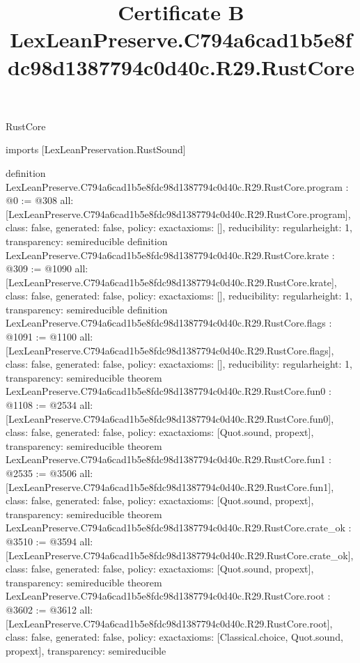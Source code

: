 \begin{lexlean}{RustCore}
\title{Certificate B LexLeanPreserve.C794a6cad1b5e8fdc98d1387794c0d40c.R29.RustCore}
\begin{coremodule}
imports [LexLeanPreservation.RustSound]

definition LexLeanPreserve.C794a6cad1b5e8fdc98d1387794c0d40c.R29.RustCore.program : @0 := @308 {
  all: [LexLeanPreserve.C794a6cad1b5e8fdc98d1387794c0d40c.R29.RustCore.program],
  class: false,
  generated: false,
  policy: exact{axioms: []},
  reducibility: regular{height: 1},
  transparency: semireducible
}
definition LexLeanPreserve.C794a6cad1b5e8fdc98d1387794c0d40c.R29.RustCore.krate : @309 := @1090 {
  all: [LexLeanPreserve.C794a6cad1b5e8fdc98d1387794c0d40c.R29.RustCore.krate],
  class: false,
  generated: false,
  policy: exact{axioms: []},
  reducibility: regular{height: 1},
  transparency: semireducible
}
definition LexLeanPreserve.C794a6cad1b5e8fdc98d1387794c0d40c.R29.RustCore.flags : @1091 := @1100 {
  all: [LexLeanPreserve.C794a6cad1b5e8fdc98d1387794c0d40c.R29.RustCore.flags],
  class: false,
  generated: false,
  policy: exact{axioms: []},
  reducibility: regular{height: 1},
  transparency: semireducible
}
theorem LexLeanPreserve.C794a6cad1b5e8fdc98d1387794c0d40c.R29.RustCore.fun0 : @1108 := @2534 {
  all: [LexLeanPreserve.C794a6cad1b5e8fdc98d1387794c0d40c.R29.RustCore.fun0],
  class: false,
  generated: false,
  policy: exact{axioms: [Quot.sound, propext]},
  transparency: semireducible
}
theorem LexLeanPreserve.C794a6cad1b5e8fdc98d1387794c0d40c.R29.RustCore.fun1 : @2535 := @3506 {
  all: [LexLeanPreserve.C794a6cad1b5e8fdc98d1387794c0d40c.R29.RustCore.fun1],
  class: false,
  generated: false,
  policy: exact{axioms: [Quot.sound, propext]},
  transparency: semireducible
}
theorem LexLeanPreserve.C794a6cad1b5e8fdc98d1387794c0d40c.R29.RustCore.crate_ok : @3510 := @3594 {
  all: [LexLeanPreserve.C794a6cad1b5e8fdc98d1387794c0d40c.R29.RustCore.crate_ok],
  class: false,
  generated: false,
  policy: exact{axioms: [Quot.sound, propext]},
  transparency: semireducible
}
theorem LexLeanPreserve.C794a6cad1b5e8fdc98d1387794c0d40c.R29.RustCore.root : @3602 := @3612 {
  all: [LexLeanPreserve.C794a6cad1b5e8fdc98d1387794c0d40c.R29.RustCore.root],
  class: false,
  generated: false,
  policy: exact{axioms: [Classical.choice, Quot.sound, propext]},
  transparency: semireducible
}


\end{coremodule}
\end{lexlean}
